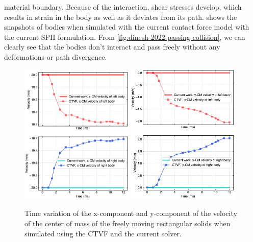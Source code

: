 material boundary. Because of the interaction, shear stresses develop, which
results in strain in the body as well as it deviates from its path.
 shows the snapshots of bodies when
simulated with the current contact force model with the current SPH
formulation. From \cref{fig:dinesh-2022-passing-collision}, we can clearly see
that the bodies don't interact and pass freely without any deformations or
path divergence.
\begin{figure}[!htpb]
  \centering
  \includegraphics[width=0.48\textwidth]{figures/csph/figures/dinesh_2022_elastic_solids_passing_by/velocity_vs_time_x}
  \includegraphics[width=0.48\textwidth]{figures/csph/figures/dinesh_2022_elastic_solids_passing_by/velocity_vs_time_y}
  \caption{Time variation of the x-component and y-component of the velocity
    of the center of mass of the freely moving rectangular solids when
    simulated using the CTVF and the current solver.}
\label{fig:results-dinesh-passing-velocity-x-y-vs-time}
\end{figure}
